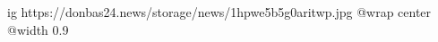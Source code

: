  
 
 
 
 

\ifcmt
  ig https://donbas24.news/storage/news/1hpwe5b5g0aritwp.jpg
  @wrap center
  @width 0.9
\fi
